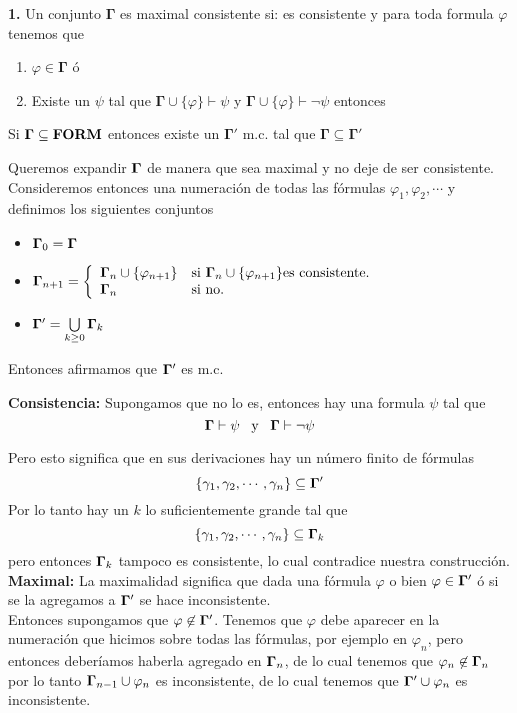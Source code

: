 \documentclass[leqno, 12pt, twoside,letterpaper]{book}
\begin{document}
\begin{solucion}
\textbf{1.} Un conjunto $\bm{\Gamma}$ es maximal consistente si: es consistente y para toda formula $\varphi$ tenemos que
\begin{enumerate}
	\item $\varphi \in \bm\Gamma$ ó
	\item Existe un $\psi$ tal que $\bm{\Gamma} \cup \{\varphi\} \vdash \psi$  y $\bm{\Gamma} \cup \{\varphi\} \vdash \lnot\psi$ entonces
\end{enumerate}

\begin{thm} Si $\bm{\Gamma} \subseteq \mathbf{FORM}$ entonces existe un $\bm{\Gamma'}$ m.c. tal que $\bm{\Gamma} \subseteq \bm{\Gamma'}$
\end{thm}

\noindent Queremos expandir $\mathbf{\Gamma}$ de manera que sea maximal y no deje de ser consistente. Consideremos entonces una numeración de todas las fórmulas $\varphi_1, \varphi_2, \cdots$ y definimos los siguientes conjuntos

\begin{itemize}
\renewcommand\labelitemi{$\sim$}
\item $\mathbf{\Gamma}_0 = \mathbf{\Gamma}$
\item $\mathbf{\Gamma}_{n+1} =
	\left\{ \begin{array}{ll} \mathbf{\Gamma}_n \cup \{\varphi_{n + 1}\} & \mbox{si } \mathbf{\Gamma}_n \cup \{\varphi_{n + 1}\} \mbox{es consistente.} \\ \mathbf{\Gamma}_n & \mbox{} \mbox{si no.} \end{array} \right.$
\item $\mathbf{\Gamma}' = \bigcup\limits_{k \geq 0} \mathbf{\Gamma}_k$
\end{itemize}

\noindent Entonces afirmamos que $\mathbf{\Gamma}'$ es m.c.

\noindent \textbf{Consistencia:} Supongamos que no lo es, entonces hay una formula $\psi$ tal que
\[\mathbf{\Gamma} \vdash \psi \mbox{ \, y \, } \mathbf{\Gamma} \vdash \lnot \psi\]

\noindent Pero esto significa que en sus derivaciones hay un número finito de fórmulas
\[\{\gamma_1, \gamma_2, \cdots, \gamma_n\} \subseteq \mathbf{\Gamma}'\]
\noindent Por lo tanto hay un $k$ lo suficientemente grande tal que
\[\{\gamma_1, \gamma_2, \cdots, \gamma_n\} \subseteq \mathbf{\Gamma}_k\]
pero entonces $\mathbf{\Gamma}_k$ tampoco es consistente, lo cual contradice nuestra construcción.\\

\noindent\textbf{Maximal:} La maximalidad significa que dada una fórmula $\varphi$ o bien $\varphi \in \mathbf{\Gamma}'$ ó si se la agregamos a $\mathbf{\Gamma}'$ se hace inconsistente. \\
\noindent Entonces supongamos que $\varphi \not\in \mathbf{\Gamma}'$. Tenemos que $\varphi$ debe aparecer en la numeración que hicimos sobre todas las fórmulas, por ejemplo en $\varphi_n$, pero entonces deberíamos haberla agregado en $\mathbf{\Gamma}_n$, de lo cual tenemos que $\varphi_n \not\in \mathbf{\Gamma}_n$ por lo tanto $\mathbf{\Gamma}_{n - 1} \cup \varphi_n$ es inconsistente, de lo cual tenemos que $\mathbf{\Gamma}' \cup \varphi_n$ es inconsistente.

\end{solucion}
\end{document}
